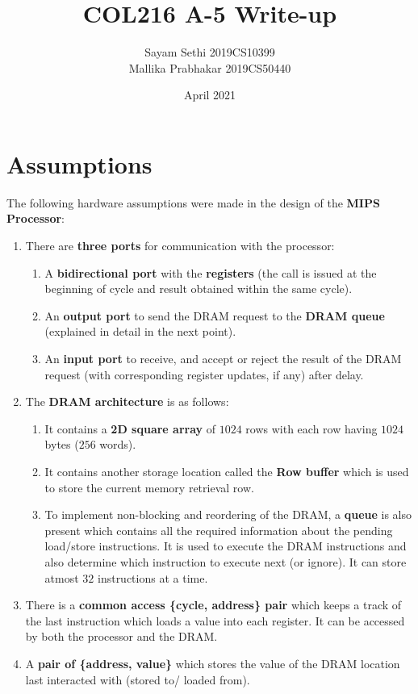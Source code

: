 \documentclass{article}
\title{COL216 A-5 Write-up}
\author{Sayam Sethi 2019CS10399 \\ Mallika Prabhakar 2019CS50440 }
\date{April 2021}
\begin{document}
\maketitle
\section{Assumptions}
The following hardware assumptions were made in the design of the \textbf{MIPS Processor}:
\begin{enumerate}
    \item There are \textbf{three ports} for communication with the processor:
        \begin{enumerate}
            \item A \textbf{bidirectional port} with the \textbf{registers} (the call is issued at the beginning of cycle and result obtained within the same cycle).
            \item An \textbf{output port} to send the DRAM request to the \textbf{DRAM queue} (explained in detail in the next point).
            \item An \textbf{input port} to receive, and accept or reject the result of the DRAM request (with corresponding register updates, if any) after delay.
        \end{enumerate}
    \item The \textbf{DRAM architecture} is as follows:
        \begin{enumerate}
            \item It contains a \textbf{2D square array} of $1024$ rows with each row having $1024$ bytes ($256$ words).
            \item It contains another storage location called the \textbf{Row buffer} which is used to store the current memory retrieval row.
            \item To implement non-blocking and reordering of the DRAM, a \textbf{queue} is also present which contains all the required information about the pending load/store instructions. It is used to execute the DRAM instructions and also determine which instruction to execute next (or ignore). It can store atmost $32$ instructions at a time.
        \end{enumerate}
    \item There is a \textbf{common access \{cycle, address\} pair} which keeps a track of the last instruction which loads a value into each register. It can be accessed by both the processor and the DRAM.
    \item A \textbf{pair of \{address, value\}} which stores the value of the DRAM location last interacted with (stored to/ loaded from).
\end{enumerate}
\end{document}
